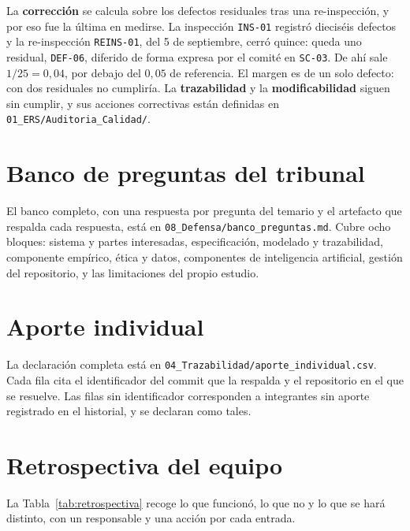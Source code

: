 \documentclass[11pt,a4paper]{article}
\begin{document}
La \textbf{correcci\'on} se calcula sobre los defectos residuales tras una
re-inspecci\'on, y por eso fue la \'ultima en medirse. La inspecci\'on \texttt{INS-01}
registr\'o diecis\'eis defectos y la re-inspecci\'on \texttt{REINS-01}, del 5 de septiembre,
cerr\'o quince: queda uno residual, \texttt{DEF-06}, diferido de forma expresa por el comit\'e
en \texttt{SC-03}. De ah\'i sale $1/25 = 0{,}04$, por debajo del $0{,}05$ de referencia. El
margen es de un solo defecto: con dos residuales no cumplir\'ia. La \textbf{trazabilidad} y la \textbf{modificabilidad}
siguen sin cumplir, y sus acciones correctivas est\'an definidas en
\texttt{01\_ERS/Auditoria\_Calidad/}.

\section{Banco de preguntas del tribunal}
\label{anx:banco}

El banco completo, con una respuesta por pregunta del temario y el artefacto que
respalda cada respuesta, est\'a en \texttt{08\_Defensa/banco\_preguntas.md}. Cubre ocho
bloques: sistema y partes interesadas, especificaci\'on, modelado y trazabilidad,
componente emp\'irico, \'etica y datos, componentes de inteligencia artificial,
gesti\'on del repositorio, y las limitaciones del propio estudio.

\section{Aporte individual}
\label{anx:aporte}

La declaraci\'on completa est\'a en
\texttt{04\_Trazabilidad/aporte\_individual.csv}. Cada fila cita el identificador del
commit que la respalda y el repositorio en el que se resuelve. Las filas sin
identificador corresponden a integrantes sin aporte registrado en el historial, y se
declaran como tales.

\section{Retrospectiva del equipo}
\label{anx:retrospectiva}

La Tabla~\ref{tab:retrospectiva} recoge lo que funcion\'o, lo que no y lo que se har\'a distinto, con un responsable y una acci\'on por cada entrada.
\end{document}
